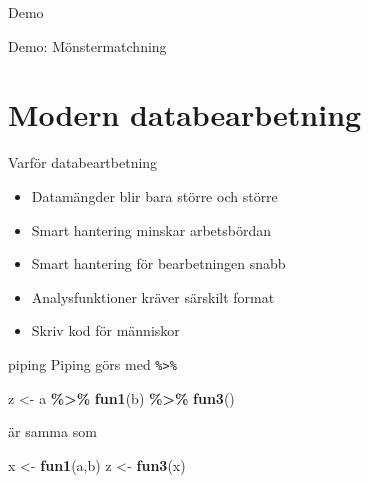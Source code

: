 \documentclass[
  10pt,
  ignorenonframetext,
  handout]{beamer}
\newenvironment{Shaded}{\begin{snugshade}}{\end{snugshade}}
\newcommand{\FunctionTok}[1]{\textcolor[rgb]{0.13,0.29,0.53}{\textbf{#1}}}
\newcommand{\NormalTok}[1]{#1}
\newcommand{\OtherTok}[1]{\textcolor[rgb]{0.56,0.35,0.01}{#1}}
\newcommand{\SpecialCharTok}[1]{\textcolor[rgb]{0.81,0.36,0.00}{\textbf{#1}}}
\providecommand{\tightlist}{%
  \setlength{\itemsep}{0pt}\setlength{\parskip}{0pt}}
\begin{document}
\begin{frame}{Demo}
\label{demo-1}
\begin{block}{Demo: Mönstermatchning}
\label{demo-muxf6nstermatchning}
\end{block}
\end{frame}

\section{Modern databearbetning}\label{modern-databearbetning}

\begin{frame}{Varför databeartbetning}
\label{varfuxf6r-databeartbetning}
\begin{itemize}
\tightlist
\item
  Datamängder blir bara större och större
\item
  Smart hantering minskar arbetsbördan
\item
  Smart hantering för bearbetningen snabb
\item
  Analysfunktioner kräver särskilt format
\item
  Skriv kod för människor
\end{itemize}
\end{frame}

\begin{frame}[fragile]{piping}
\label{piping}
Piping görs med \texttt{\%\textgreater{}\%}

\begin{Shaded}
\begin{Highlighting}[]
\NormalTok{z }\OtherTok{\textless{}{-}}\NormalTok{ a }\SpecialCharTok{\%\textgreater{}\%}
  \FunctionTok{fun1}\NormalTok{(b) }\SpecialCharTok{\%\textgreater{}\%}
  \FunctionTok{fun3}\NormalTok{()}
\end{Highlighting}
\end{Shaded}

är samma som

\begin{Shaded}
\begin{Highlighting}[]
\NormalTok{x }\OtherTok{\textless{}{-}} \FunctionTok{fun1}\NormalTok{(a,b)}
\NormalTok{z }\OtherTok{\textless{}{-}} \FunctionTok{fun3}\NormalTok{(x)}
\end{Highlighting}
\end{Shaded}
\end{frame}
\end{document}
